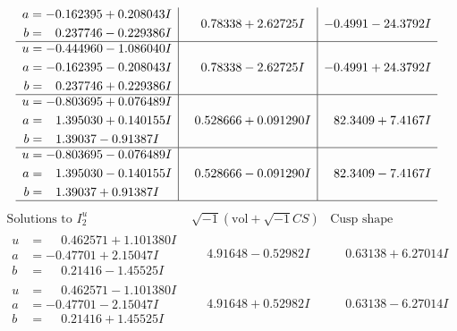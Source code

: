 \documentclass[1p]{elsarticle_modified}
\theoremstyle{definition}
\newcommand{\I}{\sqrt{-1}}
\begin{document}
$$\begin{array}{c|c|c}
\begin{aligned}
a &= -0.162395 + 0.208043 I \\
b &= \phantom{-}0.237746 - 0.229386 I\end{aligned}
 & \phantom{-}0.78338 + 2.62725 I & -0.4991 - 24.3792 I \\ \hline\begin{aligned}
u &= -0.444960 - 1.086040 I \\
a &= -0.162395 - 0.208043 I \\
b &= \phantom{-}0.237746 + 0.229386 I\end{aligned}
 & \phantom{-}0.78338 - 2.62725 I & -0.4991 + 24.3792 I \\ \hline\begin{aligned}
u &= -0.803695 + 0.076489 I \\
a &= \phantom{-}1.395030 + 0.140155 I \\
b &= \phantom{-}1.39037 - 0.91387 I\end{aligned}
 & \phantom{-}0.528666 + 0.091290 I & \phantom{-}82.3409 + 7.4167 I \\ \hline\begin{aligned}
u &= -0.803695 - 0.076489 I \\
a &= \phantom{-}1.395030 - 0.140155 I \\
b &= \phantom{-}1.39037 + 0.91387 I\end{aligned}
 & \phantom{-}0.528666 - 0.091290 I & \phantom{-}82.3409 - 7.4167 I\\
 \hline 
 \end{array}$$\newpage$$\begin{array}{c|c|c}  
\text{Solutions to }I^u_{2}& \I (\text{vol} + \sqrt{-1}CS) & \text{Cusp shape}\\
 \hline 
\begin{aligned}
u &= \phantom{-}0.462571 + 1.101380 I \\
a &= -0.47701 + 2.15047 I \\
b &= \phantom{-}0.21416 - 1.45525 I\end{aligned}
 & \phantom{-}4.91648 - 0.52982 I & \phantom{-}0.63138 + 6.27014 I \\ \hline\begin{aligned}
u &= \phantom{-}0.462571 - 1.101380 I \\
a &= -0.47701 - 2.15047 I \\
b &= \phantom{-}0.21416 + 1.45525 I\end{aligned}
 & \phantom{-}4.91648 + 0.52982 I & \phantom{-}0.63138 - 6.27014 I \\ \hline\begin{aligned}

\end{aligned}
\end{array}$$
\end{document}
